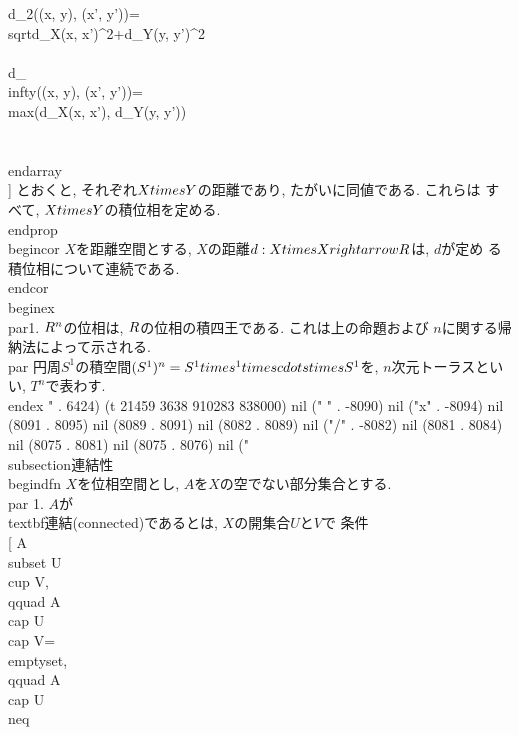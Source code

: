    d_{2}((x, y), (x', y'))=\\sqrt{d_{X}(x, x')^{2}+d_{Y}(y, y')^{2}}\\\\
   d_{\\infty}((x, y), (x', y'))=\\max(d_{X}(x, x'), d_{Y}(y, y'))\\\\
  \\end{array}
 \\]
 とおくと, それぞれ$X\\times Y$の距離であり, たがいに同値である. これらは
 すべて, $X\\times Y$の積位相を定める.
\\end{prop}
\\begin{cor}
 $X$を距離空間とする, $X$の距離$d:X\\times X\\rightarrow \\R$は, $d$が定め
 る積位相について連続である.
\\end{cor}
\\begin{ex}
 {}
\\par1. $\\R^{n}$の位相は, $\\R$の位相の積四王である. これは上の命題および
 $n$に関する帰納法によって示される.
 \\par 円周$S^{1}$の積空間$(S^{1})^{n}=S^{1}\\times ^{1}\\times\\cdots\\times
 S^{1}$を, $n$次元トーラスといい, $T^{n}$で表わす.
\\end{ex}
" . 6424) (t 21459 3638 910283 838000) nil (" " . -8090) nil ("x" . -8094) nil (8091 . 8095) nil (8089 . 8091) nil (8082 . 8089) nil ("/" . -8082) nil (8081 . 8084) nil (8075 . 8081) nil (8075 . 8076) nil ("\\subsection{連結性}
\\begin{dfn}
 $X$を位相空間とし, $A$を$X$の空でない部分集合とする.
 \\par 1. $A$が\\textbf{連結}(connected)であるとは, $X$の開集合$U$と$V$で
 条件
 \\[
  A\\subset U\\cup V, \\qquad A\\cap U\\cap V=\\emptyset, \\qquad A\\cap U\\neq
